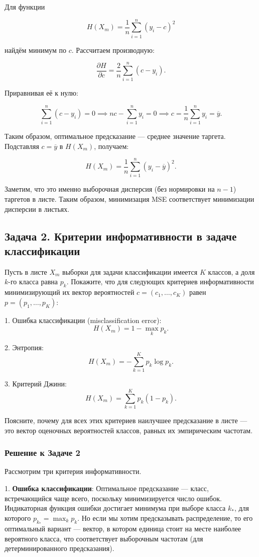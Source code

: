 Для функции

\[
    H(X_m) = \frac{1}{n} \sum_{i=1}^n (y_i - c)^2
\]

найдём минимум по \(c\). Рассчитаем производную:

\[
    \frac{\partial H}{\partial c} = \frac{2}{n} \sum_{i=1}^n (c - y_i).
\]

Приравнивая её к нулю:

\[
    \sum_{i=1}^n (c - y_i) = 0 \implies nc - \sum_{i=1}^n y_i = 0 \implies c = \frac{1}{n}\sum_{i=1}^n y_i = \overline{y}.
\]

Таким образом, оптимальное предсказание — среднее значение таргета. Подставляя \(c = \overline{y}\) в \(H(X_m)\), получаем:

\[
    H(X_m) = \frac{1}{n} \sum_{i=1}^n (y_i - \overline{y})^2.
\]

Заметим, что это именно выборочная дисперсия (без нормировки на \(n-1\)) таргетов в листе. Таким образом, минимизация MSE соответствует минимизации дисперсии в листьях.


\subsection*{Задача 2. Критерии информативности в задаче классификации}

Пусть в листе \(X_m\) выборки для задачи классификации имеется \(K\) классов, а доля \(k\)-го класса равна \(p_k\). Покажите, что для следующих критериев информативности минимизирующий их вектор вероятностей \(c = (c_1, \ldots, c_K)\) равен \(p = (p_1, \ldots, p_K)\):

1. Ошибка классификации (misclassification error): 
\[
    H(X_m) = 1 - \max_k p_k.
\]

2. Энтропия:
\[
    H(X_m) = -\sum_{k=1}^K p_k \log p_k.
\]

3. Критерий Джини:
\[
    H(X_m) = \sum_{k=1}^K p_k(1 - p_k).
\]

Поясните, почему для всех этих критериев наилучшее предсказание в листе — это вектор оценочных вероятностей классов, равных их эмпирическим частотам.

\subsubsection*{Решение к Задаче 2}

Рассмотрим три критерия информативности.

1. \textbf{Ошибка классификации}: 
Оптимальное предсказание — класс, встречающийся чаще всего, поскольку минимизируется число ошибок. Индикаторная функция ошибки достигает минимума при выборе класса \(k_*\), для которого \(p_{k_*} = \max_k p_k\). Но если мы хотим предсказывать распределение, то его оптимальный вариант — вектор, в котором единица стоит на месте наиболее вероятного класса, что соответствует выборочным частотам (для детерминированного предсказания).

